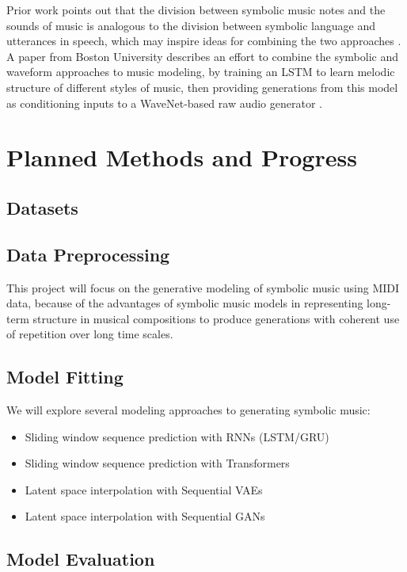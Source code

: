 \documentclass[sigconf,authorversion]{acmart}
\begin{document}
Prior work points out that the division between symbolic music notes and the
sounds of music is analogous to the division between symbolic language and
utterances in speech, which may inspire ideas for combining the two approaches
\cite{hawthorne2019enabling}. A paper from Boston University describes an effort
to combine the symbolic and waveform approaches to music modeling, by training
an LSTM to learn melodic structure of different styles of music, then providing
generations from this model as conditioning inputs to a WaveNet-based raw audio
generator \cite{manzelli_conditioning_2018}.

\section{Planned Methods and Progress}

\subsection{Datasets}

\subsection{Data Preprocessing}

This project will focus on the generative modeling of symbolic music using MIDI
data, because of the advantages of symbolic music models in representing
long-term structure in musical compositions to produce generations with coherent
use of repetition over long time scales.

\subsection{Model Fitting}

We will explore several modeling approaches to generating symbolic music:

\begin{itemize}
  \item{Sliding window sequence prediction with RNNs (LSTM/GRU)}
  \item{Sliding window sequence prediction with Transformers}
  \item{Latent space interpolation with Sequential VAEs}
  \item{Latent space interpolation with Sequential GANs}
\end{itemize}

\subsection{Model Evaluation}
\end{document}
